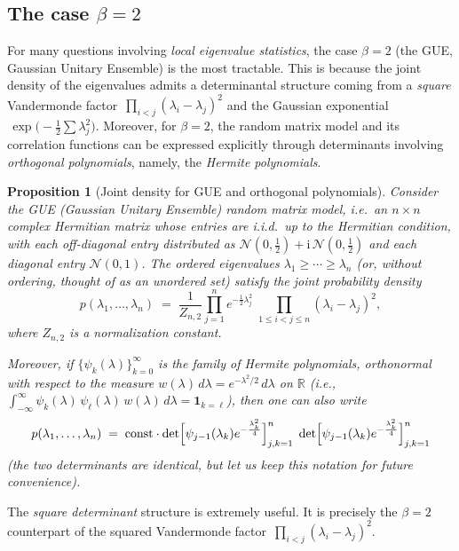 \documentclass[letterpaper,11pt,oneside,reqno]{article}
\numberwithin{equation}{section}
\newtheorem{proposition}{Proposition}[section]
\theoremstyle{definition}
\begin{document}
\subsection{The case \texorpdfstring{$\beta=2$}{beta=2}}
\label{subsec:beta2-case}

For many questions involving \emph{local eigenvalue statistics},
the case \(\beta=2\) (the GUE, Gaussian Unitary Ensemble) is the most tractable.
This is because the joint density of the eigenvalues
admits a determinantal structure coming from
a \emph{square} Vandermonde factor
\(\,\prod_{i<j} (\lambda_i - \lambda_j)^2\)
and the Gaussian exponential
\(\,\exp\bigl(-\tfrac12 \sum \lambda_j^2\bigr)\).
Moreover, for \(\beta=2\), the random matrix model
and its correlation functions
can be expressed explicitly through determinants involving
\emph{orthogonal polynomials}, namely, the \emph{Hermite polynomials}.

\begin{proposition}[Joint density for GUE and orthogonal polynomials]
  \label{prop:gue-joint-density}
  Consider the GUE (Gaussian Unitary Ensemble) random matrix model, i.e.\ an
  \(n\times n\) complex Hermitian matrix whose entries
  are i.i.d.\ up to the Hermitian condition, with each
  off-diagonal entry distributed as
  \(\mathcal{N}(0,\tfrac12)+\mathrm{i}\,\mathcal{N}(0,\tfrac12)\)
  and each diagonal entry \(\mathcal{N}(0,1)\).
  The ordered eigenvalues \(\lambda_1 \ge \cdots \ge \lambda_n\)
  (or, without ordering, thought of as an unordered set)
  satisfy the joint probability density
  \begin{equation}
  	\label{eq:gue-joint-density}
    p(\lambda_1,\ldots,\lambda_n)
    \;=\;
    \frac{1}{Z_{n,2}}
    \prod_{j=1}^n e^{-\frac12 \lambda_j^2}
    \;\prod_{1\le i<j\le n} (\lambda_i - \lambda_j)^2,
  \end{equation}
  where \(Z_{n,2}\) is a normalization constant.

	Moreover, if
  \(\{\psi_k(\lambda)\}_{k=0}^\infty\)
	is the family of Hermite polynomials, orthonormal
  with respect to the measure
  \(w(\lambda)\,d\lambda = e^{-\lambda^2/2}\,d\lambda\)
  on \(\mathbb{R}\) (i.e.,
	\(\displaystyle\int_{-\infty}^{\infty} \psi_k(\lambda)\,\psi_\ell(\lambda)\,w(\lambda)\,d\lambda = \mathbf{1}_{k=\ell}\)),
  then one can also write
  \begin{equation}
  	\label{eq:gue-joint-OP}
    p(\lambda_1,\ldots,\lambda_n)
    \;=\;
		\mathrm{const}\cdot
		\det\Bigl[\psi_{j-1}(\lambda_k)e^{-\frac{\lambda_k^2}{4}}\Bigr]_{j,k=1}^n
		\;\det\Bigl[\psi_{j-1}(\lambda_k)e^{-\frac{\lambda_k^2}{4}}\Bigr]_{j,k=1}^n
  \end{equation}
	(the two determinants are identical, but let us keep this notation for future convenience).
\end{proposition}
The \emph{square determinant} structure is extremely useful.
It is
precisely the \(\beta=2\) counterpart
of the squared Vandermonde factor
\(\,\prod_{i<j}(\lambda_i-\lambda_j)^2\).
\end{document}
